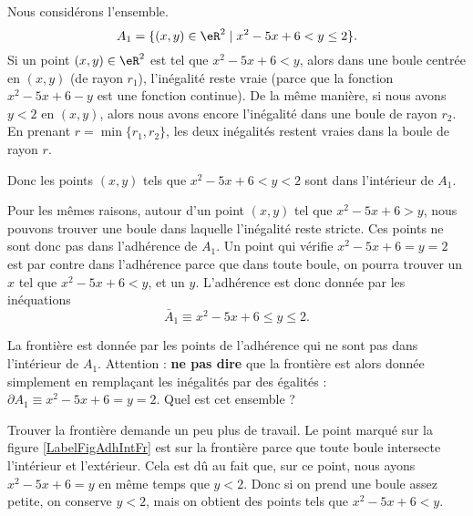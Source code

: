 \begin{example} \label{ItemExoEVN3i}
	Nous considérons l'ensemble.
	\begin{equation}
		A_1 = \{ (x, y ) \in \eR^2 \; | \; x^2 - 5x + 6 < y \leq 2 \}.
	\end{equation}
	Si un point \( (x,y)\in\eR^2\) est tel que \( x^2-5x+6<y\), alors dans une boule centrée en \( (x,y)\) (de rayon \( r_1\)), l'inégalité reste vraie (parce que la fonction \( x^2-5x+6-y\) est une fonction continue). De la même manière, si nous avons \( y<2\) en \( (x,y)\), alors nous avons encore l'inégalité dans une boule de rayon \( r_2\). En prenant \( r=\min\{ r_1,r_2 \}\), les deux inégalités restent vraies dans la boule de rayon \( r\).

	Donc les points \( (x,y)\) tels que \( x^2 - 5x + 6 < y < 2\) sont dans l'intérieur de \( A_1\).

	Pour les mêmes raisons, autour d'un point \( (x,y)\) tel que \( x^2-5x+6>y\), nous pouvons trouver une boule dans laquelle l'inégalité reste stricte. Ces points ne sont donc pas dans l'adhérence de \( A_1\). Un point qui vérifie \( x^2-5x+6= y= 2\) est par contre dans l'adhérence parce que dans toute boule, on pourra trouver un \( x\) tel que \( x^2-5x+6<y\), et un \( y\). L'adhérence est donc donnée par les inéquations
	\begin{equation}
		\bar A_1\equiv x^2-5x+6\leq y\leq 2.
	\end{equation}

	La frontière est donnée par les points de l'adhérence qui ne sont pas dans l'intérieur de \( A_1\). Attention : {\bf ne pas dire} que la frontière est alors donnée simplement en remplaçant les inégalités par des égalités : \( \partial A_1\equiv x^2-5x+6= y= 2\). Quel est cet ensemble ?

	Trouver la frontière demande un peu plus de travail. Le point marqué sur la figure \ref{LabelFigAdhIntFr} est sur la frontière parce que toute boule intersecte l'intérieur et l'extérieur. Cela est dû au fait que, sur ce point, nous ayons \( x^2-5x+6=y\) en même temps que \( y<2\). Donc si on prend une boule assez petite, on conserve \( y<2\), mais on obtient des points tels que \( x^2-5x+6<y\).


\end{example}
